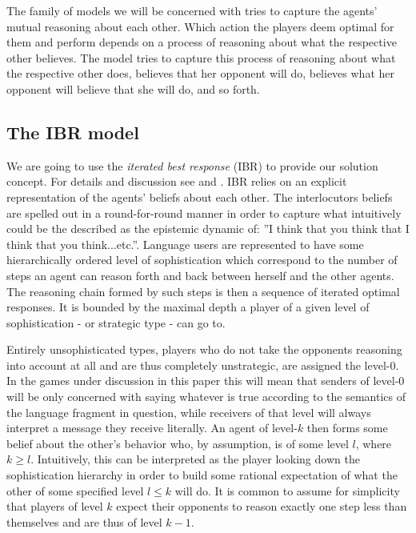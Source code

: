 \documentclass[10]{article}
\begin{document}
The family of models we will be concerned with tries to capture the agents' mutual reasoning about each other. Which action the players deem optimal for them and perform depends on a process of reasoning about what the respective other believes. The model tries to capture this process of reasoning about what the respective other does, believes that her opponent will do, believes what her opponent will believe that she will do, and so forth.
\subsection{The IBR model}
We are going to use the \textit{iterated best response} (IBR) to provide our solution concept. %
For details and discussion see \cite{franke2009signal} and \cite{franke2014pragmatic}. IBR relies on an explicit representation of the agents' beliefs about each other. The interlocutors beliefs are spelled out in a round-for-round manner in order to capture what intuitively could be the described as the epistemic dynamic of: ''I think that you think that I think that you think...etc.''. Language users are represented to have some hierarchically ordered level of sophistication which correspond to the number of steps an agent can reason forth and back between herself and the other agents. The reasoning chain formed by such steps is then a sequence of iterated optimal responses. It is bounded by the maximal depth a player of a given level of sophistication - or strategic type - can go to.

Entirely unsophisticated types, players who do not take the opponents reasoning into account at all and are thus completely unstrategic, are assigned the level-0. In the games under discussion in this paper this will mean that senders of level-0 will be only concerned with saying whatever is true according to the semantics of the language fragment in question, while receivers of that level will always interpret a message they receive literally. An agent of level-$k$ then forms some belief about the other's behavior who, by assumption, is of some level $l$, where $k\geq l$. Intuitively, this can be interpreted as the player looking down the sophistication hierarchy in order to build some rational expectation of what the other of some specified level $l\leq k$ will do. It is common to assume for simplicity that players of level $k$ expect their opponents to reason exactly one step less than themselves and are thus of level $k-1$.
\end{document}
